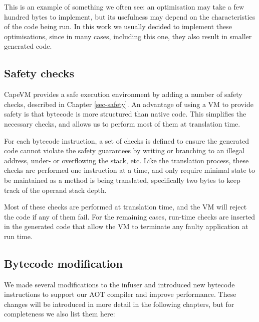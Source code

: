 This is an example of something we often see: an optimisation may take a few hundred bytes to implement, but its usefulness may depend on the characteristics of the code being run. In this work we usually decided to implement these optimisations, since in many cases, including this one, they also result in smaller generated code.


\subsection{Safety checks}
CapeVM provides a safe execution environment by adding a number of safety checks, described in Chapter \ref{sec-safety}. An advantage of using a VM to provide safety is that bytecode is more structured than native code. This simplifies the necessary checks, and allows us to perform most of them at translation time.

For each bytecode instruction, a set of checks is defined to ensure the generated code cannot violate the safety guarantees by writing or branching to an illegal address, under- or overflowing the stack, etc. Like the translation process, these checks are performed one instruction at a time, and only require minimal state to be maintained as a method is being translated, specifically two bytes to keep track of the operand stack depth.

Most of these checks are performed at translation time, and the VM will reject the code if any of them fail. For the remaining cases, run-time checks are inserted in the generated code that allow the VM to terminate any faulty application at run time.


\subsection{Bytecode modification}
\label{sec-vm-design-bytecode-modifications}
We made several modifications to the infuser and introduced new bytecode instructions to support our AOT compiler and improve performance. These changes will be introduced in more detail in the following chapters, but for completeness we also list them here:

